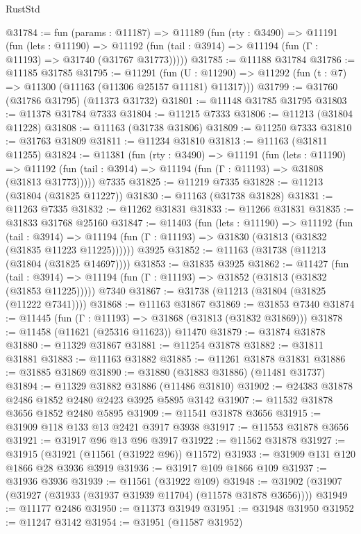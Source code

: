 \begin{lexlean}{RustStd}
\begin{coremodule}
@31784 := fun (params : @11187) =>
  @11189
    (fun (rty : @3490) =>
    @11191
      (fun (lets : @11190) =>
      @11192 (fun (tail : @3914) => @11194 (fun (Γ : @11193) => @31740 (@31767 @31773)))))
@31785 := @11188 @31784
@31786 := @11185 @31785
@31795 := @11291
    (fun (U : @11290) => @11292 (fun (t : @7) => @11300 (@11163 (@11306 @25157 @11181) @11317)))
@31799 := @31760 (@31786 @31795) (@11373 @31732)
@31801 := @11148 @31785 @31795
@31803 := @11378 @31784 @7333
@31804 := @11215 @7333
@31806 := @11213 (@31804 @11228)
@31808 := @11163 (@31738 @31806)
@31809 := @11250 @7333
@31810 := @31763 @31809
@31811 := @11234 @31810
@31813 := @11163 (@31811 @11255)
@31824 := @11381
    (fun (rty : @3490) =>
    @11191
      (fun (lets : @11190) =>
      @11192 (fun (tail : @3914) => @11194 (fun (Γ : @11193) => @31808 (@31813 @31773)))))
    @7335
@31825 := @11219 @7335
@31828 := @11213 (@31804 (@31825 @11227))
@31830 := @11163 (@31738 @31828)
@31831 := @11263 @7335
@31832 := @11262 @31831
@31833 := @11266 @31831
@31835 := @31833 @31768 @25160
@31847 := @11403
    (fun (lets : @11190) =>
    @11192
      (fun (tail : @3914) =>
      @11194 (fun (Γ : @11193) => @31830 (@31813 (@31832 (@31835 @11223 @11225))))))
    @3925
@31852 := @11163 (@31738 (@11213 (@31804 (@31825 @14697))))
@31853 := @31835 @3925
@31862 := @11427
    (fun (tail : @3914) => @11194 (fun (Γ : @11193) => @31852 (@31813 (@31832 (@31853 @11225)))))
    @7340
@31867 := @31738 (@11213 (@31804 (@31825 (@11222 @7341))))
@31868 := @11163 @31867
@31869 := @31853 @7340
@31874 := @11445 (fun (Γ : @11193) => @31868 (@31813 (@31832 @31869)))
@31878 := @11458 (@11621 (@25316 @11623)) @11470
@31879 := @31874 @31878
@31880 := @11329 @31867
@31881 := @11254 @31878
@31882 := @31811 @31881
@31883 := @11163 @31882
@31885 := @11261 @31878 @31831
@31886 := @31885 @31869
@31890 := @31880 (@31883 @31886) (@11481 @31737)
@31894 := @11329 @31882 @31886 (@11486 @31810)
@31902 := @24383 @31878 @2486 @1852 @2480 @2423 @3925 @5895 @3142
@31907 := @11532 @31878 @3656 @1852 @2480 @5895
@31909 := @11541 @31878 @3656
@31915 := @31909 @118 @133 @13 @2421 @3917 @3938
@31917 := @11553 @31878 @3656
@31921 := @31917 @96 @13 @96 @3917
@31922 := @11562 @31878
@31927 := @31915 (@31921 (@11561 (@31922 @96)) @11572)
@31933 := @31909 @131 @120 @1866 @28 @3936 @3919
@31936 := @31917 @109 @1866 @109
@31937 := @31936 @3936
@31939 := @11561 (@31922 @109)
@31948 := @31902 (@31907 (@31927 (@31933 (@31937 @31939 @11704) (@11578 @31878 @3656))))
@31949 := @11177 @2486
@31950 := @11373 @31949
@31951 := @31948 @31950
@31952 := @11247 @3142
@31954 := @31951 (@11587 @31952)

\end{coremodule}
\end{lexlean}
